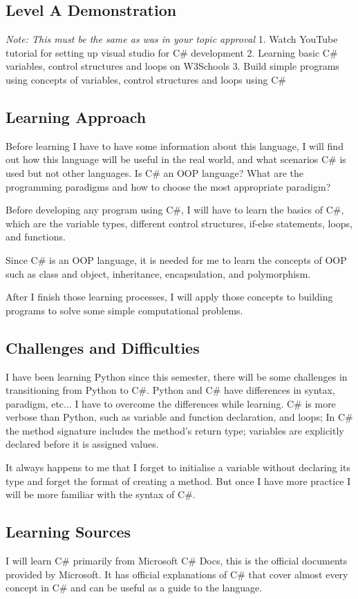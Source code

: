 \documentclass[a4paper, 11pt]{report}
\begin{document}
\subsection{Level A Demonstration}
\textit{Note: This must be the same as was in your topic approval}
1. Watch YouTube tutorial for setting up visual studio for C\# development
2. Learning basic C\# variables, control structures and loops on W3Schools
3. Build simple programs using concepts of variables, control structures and loops using C\# 
\subsection{Learning Approach}
Before learning I have to have some information about this language, I will find out how this language will be useful in the real world, and what scenarios C\# is used but not other languages. Is C\# an OOP language? What are the programming paradigms and how to choose the most appropriate paradigm?

Before developing any program using C\#, I will have to learn the basics of C#, which are the variable types, different control structures, if-else statements, loops, and functions. 

Since C\# is an OOP language, it is needed for me to learn the concepts of OOP such as class and object, inheritance, encapsulation, and polymorphism. 

After I finish those learning processes, I will apply those concepts to building programs to solve some simple computational problems.

\subsection{Challenges and Difficulties}
I have been learning Python since this semester, there will be some challenges in transitioning from Python to C\#. Python and C\# have differences in syntax, paradigm, etc... I have to overcome the differences while learning. C\# is more verbose than Python, such as variable and function declaration, and loops; In C\# the method signature includes the method's return type; variables are explicitly declared before it is assigned values.

It always happens to me that I forget to initialise a variable without declaring its type and forget the format of creating a method. But once I have more practice I will be more familiar with the syntax of C\#.

\subsection{Learning Sources}
I will learn C\# primarily from Microsoft C\# Docs, this is the official documents provided by Microsoft. It has official explanations of C\# that cover almost every concept in C\# and can be useful as a guide to the language.
\end{document}
